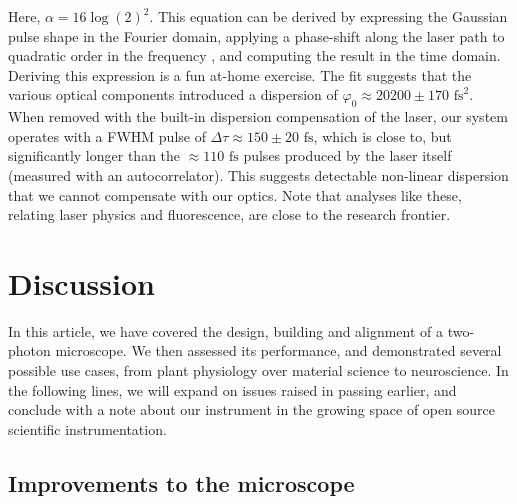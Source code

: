 \documentclass[10pt,letterpaper]{article}
\begin{document}
Here, $\alpha=16\log(2)^2$. This equation can be derived by expressing the Gaussian pulse shape in the Fourier domain, applying a phase-shift along the laser path to quadratic order in the frequency \cite{Young2015}, and computing the result in the time domain. Deriving this expression is a fun at-home exercise. The fit suggests that the various  optical components introduced a dispersion of $\varphi_0\approx20200\pm170\text{ fs}^2$. When removed with the built-in dispersion compensation of the laser, our system operates with a FWHM pulse of $\Delta\tau \approx 150\pm20\text{ fs}$, which is close to, but significantly longer than the $\approx110\text{ fs}$ pulses produced by the laser itself (measured with an autocorrelator). This suggests detectable non-linear dispersion that we cannot compensate with our optics. Note that analyses like these, relating laser physics and fluorescence, are close to the research frontier\cite{Saidi2023}.

\section*{Discussion}

In this article, we have covered the design, building and alignment of a two-photon microscope. We then assessed its performance, and demonstrated several possible use cases, from plant physiology over material science to neuroscience. In the following lines, we will expand on issues raised in passing earlier, and conclude with a note about our instrument in the growing space of open source scientific instrumentation.

\subsection*{Improvements to the microscope}
\end{document}
